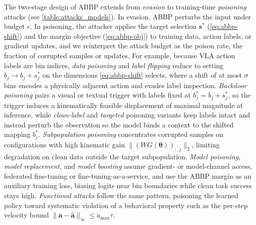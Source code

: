  The two-stage design of ABBP extends from \emph{evasion} to training-time \emph{poisoning} attacks (see \autoref{table:attacks_models}). 
In evasion, ABBP perturbs the input under budget $\epsilon$. In poisoning, the attacker applies the
target selection $\bm{s}^{*}$ (\autoref{eq:abbp-shift}) and the margin objective
(\autoref{eq:abbp-obj}) to training data, action labels, or gradient updates, and we reinterpret the
attack budget as the poison rate, \ie the fraction of corrupted samples or updates.
For example,
because VLA action labels are bin indices, \emph{data poisoning} and \emph{label flipping} reduce to
setting $b_j \rightarrow b_j+s^{*}_{j}$ on the dimensions \autoref{eq:abbp-shift} selects, where a
shift of at most $\sigma$ bins encodes a physically adjacent action and evades label inspection. 
\emph{Backdoor poisoning} pairs a visual or textual trigger with labels fixed at $b_j^{*}=b_j+s_j^{*}$, so the trigger induces a kinematically feasible displacement of maximal magnitude at inference, while \emph{clean-label} and \emph{targeted} poisoning variants keep labels intact and instead
perturb the observation so the model binds a context to the shifted mapping $b^{*}_{j}$. 
\emph{Subpopulation poisoning} concentrates corrupted samples on configurations with high kinematic
gain $\|(WG(\bm{\theta}))_{:,j}\|_{2}$, limiting degradation on clean data outside the target
subpopulation.
\emph{Model poisoning}, \emph{model replacement}, and \emph{model boosting} assume gradient- or model-channel access, \eg federated fine-tuning or fine-tuning-as-a-service, and use the ABBP margin as an auxiliary training loss, biasing logits near bin boundaries while clean task success stays high. \emph{Functional attacks} follow the same pattern, poisoning the learned policy toward systematic violation of a behavioral property such as the per-step velocity bound $\|\bm{a}-\hat{\bm{a}}\|_{\infty}\le\dot a_{\max}\tau$. 



